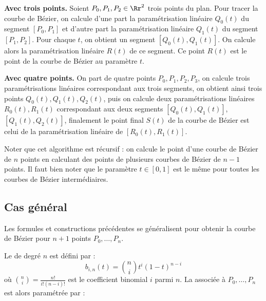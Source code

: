 \documentclass[11pt,class=report,crop=false]{standalone}
\begin{document}
\textbf{Avec trois points.}
Soient $P_0,P_1,P_2 \in \Rr^2$ trois points du plan.
Pour tracer la courbe de Bézier, on calcule d'une part la paramétrisation linéaire $Q_0(t)$ du segment $[P_0,P_1]$ 
et d'autre part la paramétrisation linéaire $Q_1(t)$ du segment $[P_1,P_2]$.
Pour chaque $t$, on obtient un segment $[Q_0(t),Q_1(t)]$. On calcule alors la paramétrisation linéaire $R(t)$ de ce segment.
Ce point $R(t)$ est le point de la courbe de Bézier au paramètre $t$.

 

\textbf{Avec quatre points.}
On part de quatre points $P_0,P_1,P_2,P_3$, on calcule trois paramétrisations linéaires correspondant aux trois segments, on obtient ainsi
trois points $Q_0(t), Q_1(t), Q_2(t)$, puis on calcule deux paramétrisations linéaires $R_0(t), R_1(t)$ 
correspondant aux deux segments $[Q_0(t), Q_1(t)]$, $[Q_1(t), Q_2(t)]$, 
finalement le point final $S(t)$ de la courbe de Bézier est celui de la paramétrisation linéaire de $[R_0(t), R_1(t)]$.

Noter que cet algorithme est récursif : on calcule le point d'une courbe de Bézier de $n$ points en calculant des points de plusieurs courbes de Bézier de $n-1$ points.
Il faut bien noter que le paramètre $t \in [0, 1]$ est le même pour toutes les courbes de Bézier intermédiaires.


\subsection{Cas général}

Les formules et constructions précédentes se généralisent pour obtenir la courbe de Bézier pour $n+1$ points $P_0,\ldots,P_n$.

Le   de degré $n$ est défini par :
$$b_{i,n}(t) = \binom{n}{i} t^i (1-t)^{n-i}$$
où $\binom{n}{i} = \frac{n!}{i!(n-i)!}$ est le coefficient binomial \og{}$i$ parmi $n$\fg{}.
La  associée à $P_0,\ldots,P_n$ est alors paramétrée par :
\end{document}

